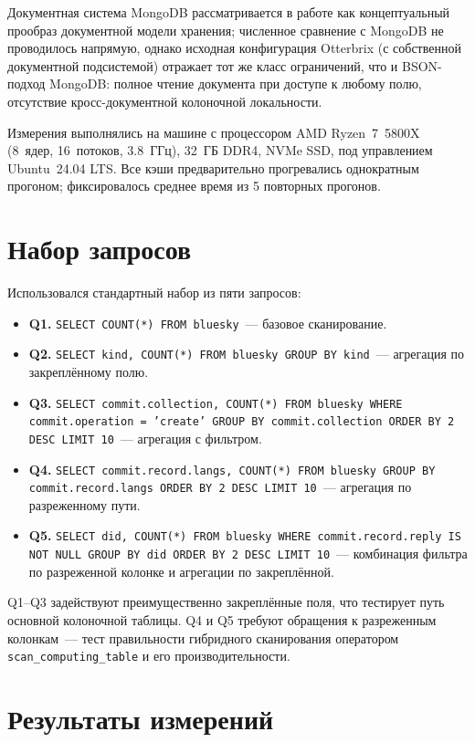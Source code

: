 Документная система MongoDB рассматривается в работе как
концептуальный прообраз документной модели хранения; численное
сравнение с MongoDB не проводилось напрямую, однако исходная
конфигурация Otterbrix (с собственной документной подсистемой)
отражает тот же класс ограничений, что и BSON-подход MongoDB:
полное чтение документа при доступе к любому полю, отсутствие
кросс-документной колоночной локальности.

Измерения выполнялись на машине с процессором AMD Ryzen~7~5800X
(8~ядер, 16~потоков, 3.8~ГГц), 32~ГБ DDR4, NVMe SSD, под
управлением Ubuntu~24.04 LTS. Все кэши предварительно прогревались
однократным прогоном; фиксировалось среднее время из 5 повторных
прогонов.

\section{Набор запросов}

Использовался стандартный набор из пяти запросов:
\begin{itemize}
    \item \textbf{Q1.} \texttt{SELECT COUNT(*) FROM bluesky}~---
    базовое сканирование.
    \item \textbf{Q2.} \texttt{SELECT kind, COUNT(*) FROM bluesky
    GROUP BY kind}~--- агрегация по закреплённому полю.
    \item \textbf{Q3.} \texttt{SELECT commit.collection, COUNT(*)
    FROM bluesky WHERE commit.operation = 'create' GROUP BY
    commit.collection ORDER BY 2 DESC LIMIT 10}~--- агрегация с
    фильтром.
    \item \textbf{Q4.} \texttt{SELECT commit.record.langs,
    COUNT(*) FROM bluesky GROUP BY commit.record.langs ORDER BY 2
    DESC LIMIT 10}~--- агрегация по разреженному пути.
    \item \textbf{Q5.} \texttt{SELECT did, COUNT(*) FROM bluesky
    WHERE commit.record.reply IS NOT NULL GROUP BY did ORDER BY 2
    DESC LIMIT 10}~--- комбинация фильтра по разреженной колонке и
    агрегации по закреплённой.
\end{itemize}

Q1--Q3 задействуют преимущественно закреплённые поля, что тестирует
путь основной колоночной таблицы. Q4 и Q5 требуют обращения к
разреженным колонкам~--- тест правильности гибридного
сканирования оператором \texttt{scan\_computing\_table} и его
производительности.

\section{Результаты измерений}

